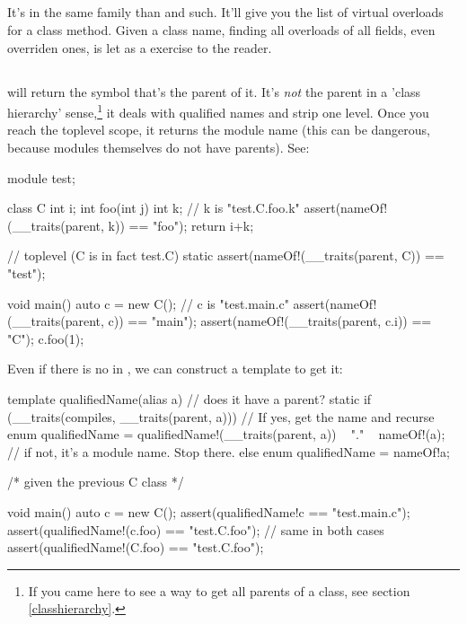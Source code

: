 \subsection{}

It's in the same family than  and such. It'll give you the list of virtual overloads for a class method. Given a class name, finding all overloads of all fields, even overriden ones, is let as a exercise to the reader.

\subsection{}

 will return the symbol that's the parent of it. It's \emph{not} the parent in a 'class hierarchy' sense,\footnote{ If you came here to see a way to get all parents of a class, see section \ref{classhierarchy}.} it deals with qualified names and strip one level. Once you reach the toplevel scope, it returns the module name (this can be dangerous, because modules themselves do not have parents). See:

\begin{dcode}
module test;

class C
{
    int i;
    int foo(int j)
    {
        int k; // k is "test.C.foo.k"
        assert(nameOf!(__traits(parent, k)) == "foo");
        return i+k;
    }
}

// toplevel (C is in fact test.C)
static assert(nameOf!(__traits(parent, C)) == "test");

void main() 
{
    auto c = new C(); // c is "test.main.c"
    assert(nameOf!(__traits(parent, c)) == "main");
    assert(nameOf!(__traits(parent, c.i)) == "C");
    c.foo(1);
}
\end{dcode}

Even if there is no  in , we can construct a template to get it:

\begin{dcode}
template qualifiedName(alias a)
{
    // does it have a parent?
    static if (__traits(compiles, __traits(parent, a)))
    // If yes, get the name and recurse
        enum qualifiedName = qualifiedName!(__traits(parent, a)) 
                           ~  "." ~ nameOf!(a);
    // if not, it's a module name. Stop there.
    else
        enum qualifiedName = nameOf!a;
}

/* given the previous C class */

void main()
{
    auto c = new C();
    assert(qualifiedName!c == "test.main.c");
    assert(qualifiedName!(c.foo) == "test.C.foo"); // same in both cases
    assert(qualifiedName!(C.foo) == "test.C.foo");
}
\end{dcode}

